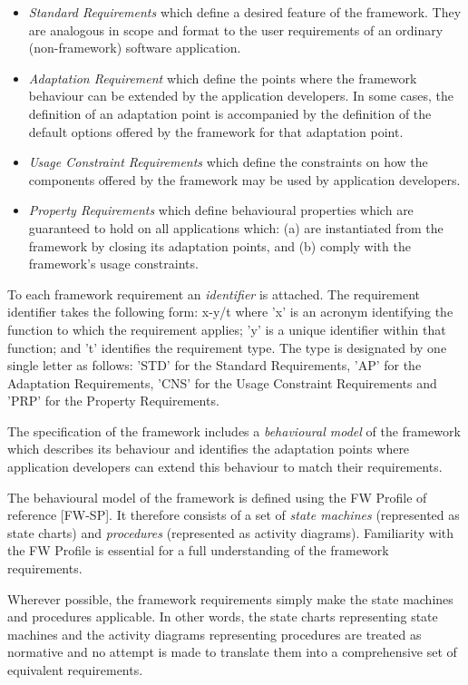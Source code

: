 \documentclass{pnp_article}
\begin{document}
\begin{itemize}
\item{} \textit{Standard Requirements} which define a desired feature of the framework. 
They are analogous in scope and format to the user requirements of an ordinary (non-framework) software application.
\item{} \textit{Adaptation Requirement} which define the points where the framework behaviour can be extended by the application developers. 
In some cases, the definition of an adaptation point is accompanied by the definition of the default options offered by the framework for that adaptation point.  
\item{} \textit{Usage Constraint Requirements} which define the constraints on how the components offered by the framework may be used by application developers.
\item{} \textit{Property Requirements} which define behavioural properties which are guaranteed to hold on all applications which: (a) are instantiated from the framework by closing its adaptation points, and (b) comply with the framework's usage constraints.
\end{itemize}

To each framework requirement an \textit{identifier} is attached.
The requirement identifier takes the following form: x-y/t where 'x' is an acronym identifying the function to which the requirement applies; 'y' is a unique identifier within that function; and 't' identifies the requirement type. 
The type is designated by one single letter as follows: 'STD' for the Standard Requirements, 'AP' for the Adaptation Requirements, 'CNS' for the Usage Constraint Requirements and 'PRP' for the Property Requirements.

The specification of the framework includes a \textit{behavioural model} of the framework which describes its behaviour and identifies the adaptation points where application developers can extend this behaviour to match their requirements.  

The behavioural model of the framework is defined using the FW Profile of reference [FW-SP]. 
It therefore consists of a set of \textit{state machines} (represented as state charts) and \textit{procedures} (represented as  activity diagrams). 
Familiarity with the FW Profile is essential for a full understanding of the framework requirements.

Wherever possible, the framework requirements simply make the state machines and procedures applicable. In other words, the state charts representing state machines and the activity diagrams representing procedures are treated as normative and no attempt is made to translate them into a comprehensive set of equivalent requirements.
\end{document}
